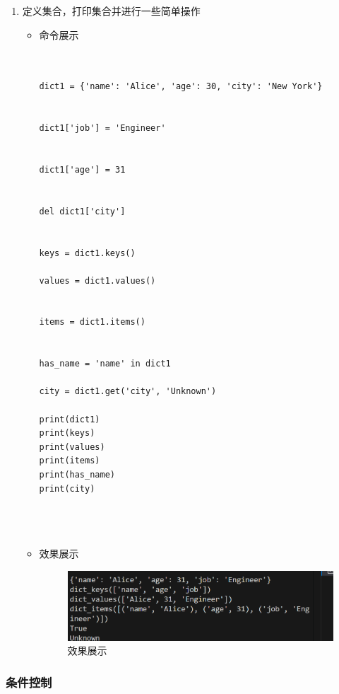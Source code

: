 \documentclass[UTF8]{ctexart}
\begin{document}
\begin{enumerate}
  \item 定义集合，打印集合并进行一些简单操作
  \begin{itemize}
  \item 命令展示
  \begin{verbatim}
 

dict1 = {'name': 'Alice', 'age': 30, 'city': 'New York'}


dict1['job'] = 'Engineer'


dict1['age'] = 31


del dict1['city']


keys = dict1.keys()

values = dict1.values()


items = dict1.items()


has_name = 'name' in dict1

city = dict1.get('city', 'Unknown')

print(dict1)           
print(keys)             
print(values)           
print(items)            
print(has_name)       
print(city)             


    
  \end{verbatim}

  \item 效果展示
  \begin{figure}[H]
    \centering
    \includegraphics[width=\textwidth]{24} %
    \caption{效果展示}
  
  \end{figure}
\end{itemize}
\end{enumerate}

















\subsubsection{条件控制}
\end{document}
